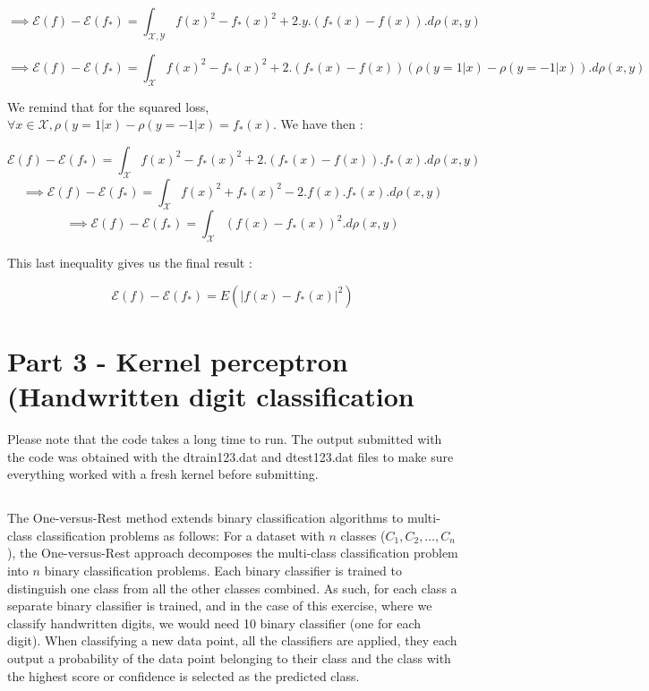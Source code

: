 \documentclass[final,3p,times,12pt]{article}
\begin{document}
\[ \implies
\mathcal{E}(f) - \mathcal{E}(f_*) = \int_\mathcal{X,Y} f(x)^2 - f_*(x)^2 + 2.y.(f_*(x) - f(x)) .  d\rho(x,y)
\]

\[ \implies
\mathcal{E}(f) - \mathcal{E}(f_*) = \int_\mathcal{X} f(x)^2 - f_*(x)^2 + 2.(f_*(x) - f(x))(\rho(y=1|x)-\rho(y=-1|x)) .  d\rho(x,y)
\]

We remind that for the squared loss, $\forall x \in \mathcal{X}, \rho(y=1|x)-\rho(y=-1|x) = f_*(x)$. We have then : 

\[
\mathcal{E}(f) - \mathcal{E}(f_*) = \int_\mathcal{X} f(x)^2 - f_*(x)^2 + 2.(f_*(x) - f(x)).f_*(x) .  d\rho(x,y)
\]
\[ \implies
\mathcal{E}(f) - \mathcal{E}(f_*) = \int_\mathcal{X} f(x)^2 + f_*(x)^2 - 2.f(x).f_*(x) .  d\rho(x,y)
\]
\[ \implies
\mathcal{E}(f) - \mathcal{E}(f_*) = \int_\mathcal{X} (f(x) - f_*(x))^2.  d\rho(x,y)
\]

This last inequality gives us the final result : 

\[
\mathcal{E}(f) - \mathcal{E}(f_*) = E( |f(x) - f_*(x)|^2)
\]

\section{Part 3 - Kernel perceptron (Handwritten digit classification}

Please note that the code takes a long time to run. The output submitted with the code was obtained with the dtrain123.dat and dtest123.dat files to make sure everything worked with a fresh kernel before submitting.

\subsection{}

The One-versus-Rest method extends binary classification algorithms to multi-class classification problems as follows: For a dataset with \(n\) classes (\(C_1, C_2, \dots, C_n\)), the One-versus-Rest approach decomposes the multi-class classification problem into \(n\) binary classification problems. Each binary classifier is trained to distinguish one class from all the other classes combined. As such, for each class a separate binary classifier is trained, and in the case of this exercise, where we classify handwritten digits, we would need 10 binary classifier (one for each digit). When classifying a new data point, all the classifiers are applied, they each output a probability of the data point belonging to their class and the class with the highest score or confidence is selected as the predicted class.
\end{document}
